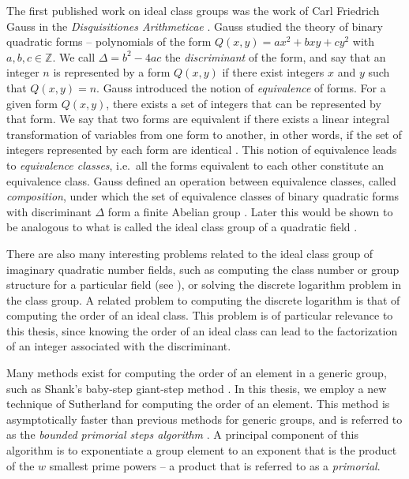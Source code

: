 \documentclass{ucalgthes1}
\theoremstyle{definition}
\newcommand{\ZZ}{\mathbb{Z}}
\begin{document}
The first published work on ideal class groups was the work of Carl Friedrich Gauss in the \emph{Disquisitiones Arithmeticae} \cite{Gauss1986}.  Gauss studied the theory of binary quadratic forms -- polynomials of the form $Q(x, y) = ax^2 + bxy + cy^2$ with $a, b, c \in \ZZ$.   We call $\Delta = b^2 - 4ac$ the \emph{discriminant} of the form, and say that an integer $n$ is represented by a form $Q(x, y)$ if there exist integers $x$ and $y$ such that $Q(x, y) = n$.  Gauss introduced the notion of \emph{equivalence} of forms.  For a given form $Q(x, y)$, there exists a set of integers that can be represented by that form.  We say that two forms are equivalent if there exists a linear integral transformation of variables from one form to another, in other words, if the set of integers represented by each form are identical \cite[p.239]{Crandall2001}.  This notion of equivalence leads to \emph{equivalence classes}, i.e.\ all the forms equivalent to each other constitute an equivalence class.  Gauss defined an operation between equivalence classes, called \emph{composition}, under which the set of equivalence classes of binary quadratic forms with discriminant $\Delta$ form a finite Abelian group \cite[p.136]{Cohn1980}.  Later this would be shown to be analogous to what is called the ideal class group of a quadratic field \cite{Frolich1993}.

There are also many interesting problems related to the ideal class group of imaginary quadratic number fields, such as computing the class number or group structure for a particular field (see \cite{Ramachandran2006}), or solving the discrete logarithm problem in the class group.  A related problem to computing the discrete logarithm is that of computing the order of an ideal class.  This problem is of particular relevance to this thesis, since knowing the order of an ideal class can lead to the factorization of an integer associated with the discriminant.

Many methods exist for computing the order of an element in a generic group, such as Shank's baby-step giant-step method \cite{Shanks1971}.  In this thesis, we employ a new technique of Sutherland \cite{Sutherland2007} for computing the order of an element.  This method is asymptotically faster than previous methods for generic groups, and is referred to as the \emph{bounded primorial steps algorithm} \cite[\S 4.1]{Sutherland2007}.  A principal component of this algorithm is to exponentiate a group element to an exponent that is the product of the $w$ smallest prime powers -- a product that is referred to as a \emph{primorial}.
\end{document}
